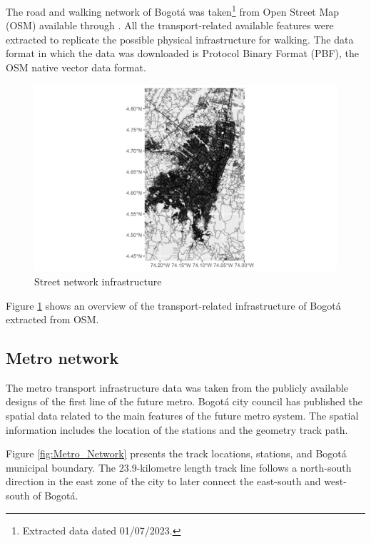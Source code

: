 \documentclass[12pt, a4paper]{report}
\begin{document}
The road and walking network of Bogotá was taken\footnote{Extracted data dated 01/07/2023.} from Open Street Map (OSM) available through \cite{hotexporttoolHOTExportTool2023}. All the transport-related available features were extracted to replicate the possible physical infrastructure for walking. The data format in which the data was downloaded is Protocol Binary Format (PBF), the OSM native vector data format.

\begin{figure}[H]
    \centering
    \includegraphics[width=15cm]{Data/Results/Images/OSM_Network.png}
    \caption{Street network infrastructure \citep{openstreetmapcontributorsPlanetDumpRetrieved2023}}
    \label{fig:OSM_Network}
\end{figure}

Figure \ref{fig:OSM_Network} shows an overview of the transport-related infrastructure of Bogotá extracted from OSM. 


\subsection{Metro network}

The metro transport infrastructure data was taken from the publicly available designs of the first line of the future metro. Bogotá city council has published the spatial data related to the main features of the future metro system. The spatial information includes the location of the stations and the geometry track path.

Figure \ref{fig:Metro_Network} presents the track locations, stations, and Bogotá municipal boundary. The 23.9-kilometre length track line follows a north-south direction in the east zone of the city to later connect the east-south and west-south of Bogotá.
\end{document}
